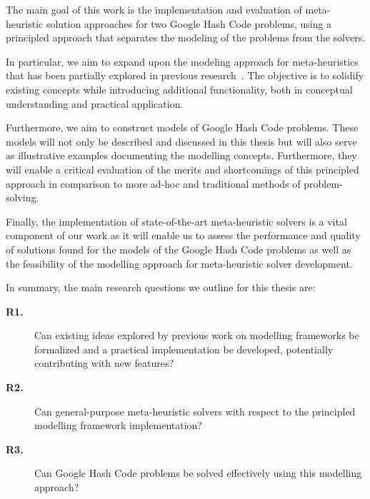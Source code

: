 The main goal of this work is the implementation and evaluation of meta-
heuristic solution approaches for two Google Hash Code problems, using a
principled approach that separates the modeling of the problems from the
solvers.

In particular, we aim to expand upon the modeling approach for meta-heuristics
that has been partially explored in previous
research~\cite{vieira2009uma,fonseca2021nasf4nio,outeiro2021application}. The
objective is to solidify existing concepts while introducing additional
functionality, both in conceptual understanding and practical application.

Furthermore, we aim to construct models of Google Hash Code problems. These
models will not only be described and discussed in this thesis but will also
serve as illustrative examples documenting the modelling concepts. Furthermore,
they will enable a critical evaluation of the merits and shortcomings of this
principled approach in comparison to more ad-hoc and traditional methods of
problem-solving.

Finally, the implementation of state-of-the-art meta-heuristic solvers is a
vital component of our work as it will enable us to assess the performance and
quality of solutions found for the models of the Google Hash Code problems as
well as the feasibility of the modelling approach for meta-heuristic solver
development.

In summary, the main research questions we outline for this thesis are:

\begin{description}
  \item[\textbf{R1.}] Can existing ideas explored by previous work on modelling
    frameworks \cite{vieira2009uma,fonseca2021nasf4nio,outeiro2021application}
    be formalized and a practical implementation be developed, potentially contributing with new
    features?

  \item[\textbf{R2.}] Can general-purpose meta-heuristic solvers with respect to
    the principled modelling framework implementation?

  \item[\textbf{R3.}] Can Google Hash Code problems be solved effectively using
    this modelling approach?
\end{description}